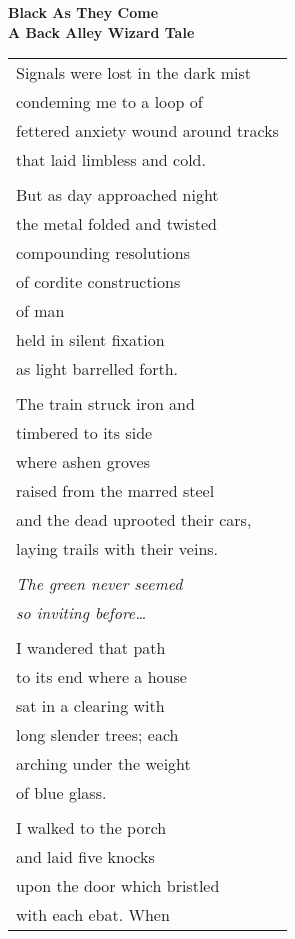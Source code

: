 \documentclass{article}
\begin{document}
\begin{center}
{\Large\textbf{Black As They Come}} \\
{\footnotesize\textbf{A Back Alley Wizard Tale}} \\
\vspace*{2ex}
\begin{tabular}{l}
Signals were lost in the dark mist \\
condeming me to a loop of \\
fettered anxiety wound around tracks \\
that laid limbless and cold. \\
\\
But as day approached night \\
the metal folded and twisted \\
compounding resolutions \\
of cordite constructions \\
of man \\
held in silent fixation \\
as light barrelled forth. \\
\\
The train struck iron and \\
timbered to its side \\
where ashen groves \\
raised from the marred steel \\
and the dead uprooted their cars, \\
laying trails with their veins. \\ %
\\
\hspace*{4ex}\textit{The green never seemed} \\
\hspace*{4ex}\textit{so inviting before\ldots} \\
\\
I wandered that path \\
to its end where a house \\
sat in a clearing with \\
long slender trees; each \\
arching under the weight \\
of blue glass. \\
\\
I walked to the porch \\
and laid five knocks \\
upon the door which bristled \\
with each ebat.  When \\

\end{tabular}
\end{center}
\end{document}
